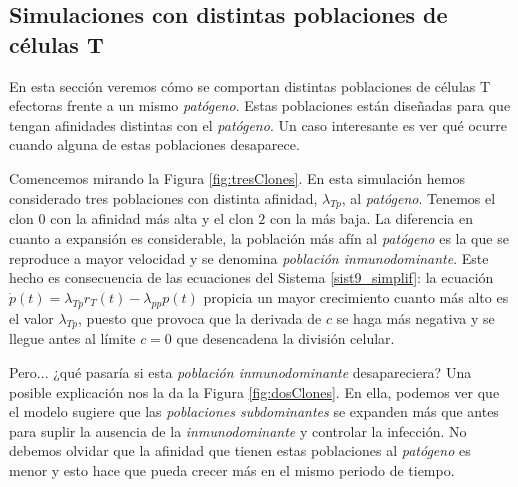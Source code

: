 \subsection{Simulaciones con distintas poblaciones de células T}

En esta sección veremos cómo se comportan distintas poblaciones de células T efectoras frente a un mismo \textit{patógeno}. Estas poblaciones están diseñadas para que tengan afinidades distintas con el \textit{patógeno}. Un caso interesante es ver qué ocurre cuando alguna de estas poblaciones desaparece. 

Comencemos mirando la Figura \ref{fig:tresClones}. En esta simulación hemos considerado tres poblaciones con distinta afinidad, $\lambda_{Tp}$, al \textit{patógeno}. Tenemos el clon $0$ con la afinidad más alta y el clon $2$ con la más baja. La diferencia en cuanto a expansión es considerable, la población más afín al \textit{patógeno} es la que se reproduce a mayor velocidad y se denomina \textit{población inmunodominante}. Este hecho es consecuencia de las ecuaciones del Sistema \ref{sist9_simplif}: la ecuación $\dot{p}(t) = \lambda_{Tp}r_{T}(t) - \lambda_{pp}p(t)$ propicia un mayor crecimiento cuanto más alto es el valor $\lambda_{Tp}$, puesto que provoca que la derivada de $c$ se haga más negativa y se llegue antes al límite $c = 0$ que desencadena la división celular.



Pero... ¿qué pasaría si esta \textit{población inmunodominante} desapareciera? Una posible explicación nos la da la Figura \ref{fig:dosClones}. En ella, podemos ver que el modelo sugiere que las \textit{poblaciones subdominantes} se expanden más que antes para suplir la ausencia de la \textit{inmunodominante} y controlar la infección. No debemos olvidar que la afinidad que tienen estas poblaciones al \textit{patógeno} es menor y esto hace que pueda crecer más en el mismo periodo de tiempo.



